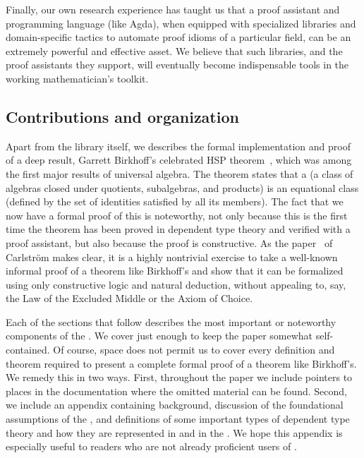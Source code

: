 \documentclass[a4paper,UKenglish,cleveref,autoref,thm-restate]{lipics-v2021}
\begin{document}
Finally, our own research experience has taught us that a proof assistant and programming language (like Agda), when equipped with specialized libraries and domain-specific tactics to automate proof idioms of a particular field, can be an extremely powerful and effective asset. We believe that such libraries, and the proof assistants they support, will eventually become indispensable tools in the working mathematician's toolkit.



\subsection{Contributions and organization}
\label{sec:contributions}
Apart from the library itself, we describes the formal implementation and proof of a deep result, Garrett Birkhoff's celebrated HSP theorem~\cite{Birkhoff:1935}, which was among the first major results of universal algebra.  The theorem states that a  (a class of algebras closed under quotients, subalgebras, and products) is an equational class (defined by the set of identities satisfied by all its members).  %
The fact that we now have a formal proof of this is noteworthy, not only because this is the first time the theorem has been proved in dependent type theory and verified with a proof assistant, but also because the proof is constructive. As the paper~\cite{Carlstrom:2008} of Carlstr\"om makes clear, it is a highly nontrivial exercise to take a well-known informal proof of a theorem like Birkhoff's and show that it can be formalized using only constructive logic and natural deduction, without appealing to, say, the Law of the Excluded Middle or the Axiom of Choice.

Each of the sections that follow describes the most important or noteworthy components of the \ualib. We cover just enough to keep the paper somewhat self-contained.  Of course, space does not permit us to cover every definition and theorem required to present a complete formal proof of a theorem like Birkhoff's.  We remedy this in two ways. First, throughout the paper we include pointers to places in the documentation where the omitted material can be found.  Second, we include an appendix containing \agda background, discussion of the foundational assumptions of the \ualib, and definitions of some important types of dependent type theory and how they are represented in \agda and in the \ualib.  We hope this appendix is especially useful to readers who are not already proficient users of \agda.
\end{document}
